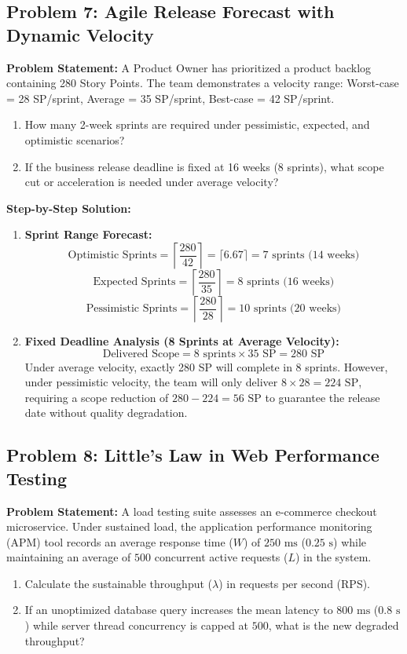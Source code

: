 \subsection*{Problem 7: Agile Release Forecast with Dynamic Velocity}
\textbf{Problem Statement:} A Product Owner has prioritized a product backlog containing 280 Story Points. The team demonstrates a velocity range: Worst-case = 28 SP/sprint, Average = 35 SP/sprint, Best-case = 42 SP/sprint.
\begin{enumerate}[label=(\alph*)]
    \item How many 2-week sprints are required under pessimistic, expected, and optimistic scenarios?
    \item If the business release deadline is fixed at 16 weeks (8 sprints), what scope cut or acceleration is needed under average velocity?
\end{enumerate}

\textbf{Step-by-Step Solution:}
\begin{enumerate}[label=(\alph*)]
    \item \textbf{Sprint Range Forecast:}
    \[
    \text{Optimistic Sprints} = \left\lceil \frac{280}{42} \right\rceil = \lceil 6.67 \rceil = 7\text{ sprints (14 weeks)}
    \]
    \[
    \text{Expected Sprints} = \left\lceil \frac{280}{35} \right\rceil = 8\text{ sprints (16 weeks)}
    \]
    \[
    \text{Pessimistic Sprints} = \left\lceil \frac{280}{28} \right\rceil = 10\text{ sprints (20 weeks)}
    \]
    \item \textbf{Fixed Deadline Analysis (8 Sprints at Average Velocity):}
    \[
    \text{Delivered Scope} = 8\text{ sprints} \times 35\text{ SP} = 280\text{ SP}
    \]
    Under average velocity, exactly 280 SP will complete in 8 sprints. However, under pessimistic velocity, the team will only deliver $8 \times 28 = 224\text{ SP}$, requiring a scope reduction of $280 - 224 = 56\text{ SP}$ to guarantee the release date without quality degradation.
\end{enumerate}

\subsection*{Problem 8: Little's Law in Web Performance Testing}
\textbf{Problem Statement:} A load testing suite assesses an e-commerce checkout microservice. Under sustained load, the application performance monitoring (APM) tool records an average response time ($W$) of $250\text{ ms}$ ($0.25\text{ s}$) while maintaining an average of $500$ concurrent active requests ($L$) in the system.
\begin{enumerate}[label=(\alph*)]
    \item Calculate the sustainable throughput ($\lambda$) in requests per second (RPS).
    \item If an unoptimized database query increases the mean latency to $800\text{ ms}$ ($0.8\text{ s}$) while server thread concurrency is capped at $500$, what is the new degraded throughput?
\end{enumerate}

